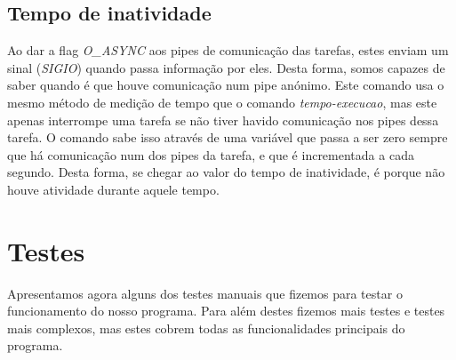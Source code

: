\documentclass[a4paper]{report}
\begin{document}
	\section{Tempo de inatividade}
	Ao dar a flag \emph{O\_ASYNC} aos pipes de comunicação das tarefas, estes enviam um sinal (\emph{SIGIO}) quando passa informação por eles. Desta forma, somos capazes de saber quando é que houve comunicação num pipe anónimo. Este comando usa o mesmo método de medição de tempo que o comando \emph{tempo-execucao}, mas este apenas interrompe uma tarefa se não tiver havido comunicação nos pipes dessa tarefa. O comando sabe isso através de uma variável que passa a ser zero sempre que há comunicação num dos pipes da tarefa, e que é incrementada a cada segundo. Desta forma, se chegar ao valor do tempo de inatividade, é porque não houve atividade durante aquele tempo.
		
	\chapter{Testes}
	
	Apresentamos agora alguns dos testes manuais que fizemos para testar o funcionamento do nosso programa. Para além destes fizemos mais testes e testes mais complexos, mas estes cobrem todas as funcionalidades principais do programa.
	
\end{document}
